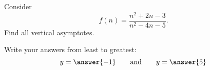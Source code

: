 \documentclass{ximera}
\author{Bart Snapp}
\begin{document}
\begin{exercise}
Consider 
\[
f(n) = \frac{n^2+2 n-3}{n^2-4 n-5}.
\]
Find all vertical asymptotes.
\begin{prompt}
\begin{multipleChoice}
\end{multipleChoice}
\begin{exercise}Write your answers from least to greatest:
\[
y=\answer{-1}\qquad\text{and}\qquad y=\answer{5}
\]
\end{exercise}
\end{prompt}
\end{exercise}
\end{document}
